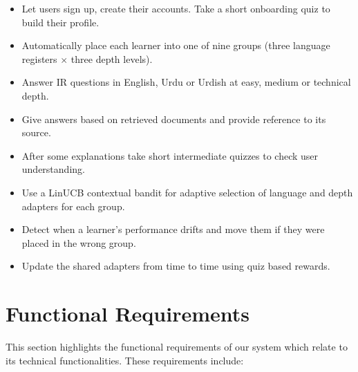 \documentclass{FastFyp}
\begin{document}
\begin{itemize}
    \item Let users sign up, create their accounts. Take a short onboarding quiz to build their profile.
    \item Automatically place each learner into one of nine groups (three language registers $\times$ three depth levels).
    \item Answer IR questions in English, Urdu or Urdish at easy, medium or technical depth.
    \item Give answers based on retrieved documents and provide reference to its source.
    \item After some explanations take short intermediate quizzes to check user understanding.
    \item Use a LinUCB contextual bandit for adaptive selection of language and depth adapters for each group.
    \item Detect when a learner’s performance drifts and move them if they were placed in the wrong group.
    \item Update the shared adapters from time to time using quiz based rewards.
\end{itemize}
\section{Functional Requirements}
This section highlights the functional requirements of our system which relate to its technical functionalities. These requirements include:
\end{document}
